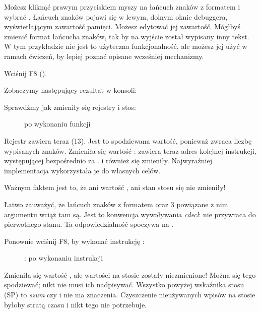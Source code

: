 Możesz kliknąć prawym przyciskiem myszy na łańcuch znaków z formatem i wybrać .
Łańcuch znaków pojawi się w lewym, dolnym oknie debuggera, wyświetlającym zawartość pamięci.
Możesz edytować jej zawartość.
Mógłbyś zmienić format łańcucha znaków, tak by na wyjście został wypisany inny tekst.
W tym przykładzie nie jest to użyteczna funkcjonalność, ale możesz jej użyć w ramach ćwiczeń, by lepiej poznać opisane wcześniej mechanizmy.

\clearpage
Wciśnij F8 (\stepover).

Zobaczymy następujący rezultat w konsoli:



Sprawdźmy jak zmieniły się rejestry i stos:

\begin{figure}[H]
\centering
{}
\caption{\olly po wykonaniu funkcji \printf{}}
\label{fig:printf3_olly_3}
\end{figure}

Rejestr \EAX zawiera teraz  (13).
Jest to spodziewana wartość, ponieważ \printf zwraca liczbę wypisanych znaków.
Zmieniła się wartość \EIP: zawiera teraz adres kolejnej instrukcji, występującej bezpośrednio za .
\ECX i \EDX również się zmieniły.
Najwyraźniej implementacja \printf wykorzystała je do własnych celów.

Ważnym faktem jest to, że ani wartość \ESP, ani stan stosu się nie zmieniły!

Łatwo zauważyć, że łańcuch znaków z formatem oraz 3 powiązane z nim argumentu wciąż tam są. Jest to konwencja wywoływania \emph{cdecl}:  nie przywraca \ESP do pierwotnego stanu.
Ta odpowiedzialność spoczywa na .

\clearpage
Ponownie wciśnij F8, by wykonać instrukcję :

\begin{figure}[H]
\centering
{}
\caption{\olly: po wykonaniu instrukcji }
\label{fig:printf3_olly_4}
\end{figure}

Zmieniła się wartość \ESP, ale wartości na stosie zostały niezmienione!
Można się tego spodziewać; nikt nie musi ich nadpisywać.
Wszystko powyżej wskaźnika stosu (\ac{SP}) to \emph{szum} czy \emph{\garbage{}} i nie ma znaczenia.
Czyszczenie nieużywanych wpisów na stosie byłoby stratą czasu i nikt tego nie potrzebuje.


